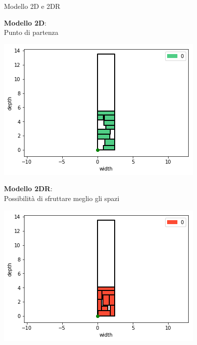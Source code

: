 \documentclass{beamer}
\begin{document}
\begin{frame}{Modello 2D e 2DR}
												
	\begin{minipage}[c]{0.45\textwidth}
		\textbf{Modello 2D}:\\Punto di partenza
	\end{minipage}
	\hfill
	\begin{minipage}[c]{0.45\textwidth}
		\includegraphics[width=1\linewidth]{figures/general2D}
	\end{minipage}
										
	\begin{minipage}[c]{0.45\textwidth}
		\textbf{Modello 2DR}:\\Possibilit\`a di sfruttare meglio gli spazi
	\end{minipage}
	\hfill
	\begin{minipage}[c]{0.45\textwidth}
		\includegraphics[width=1\linewidth]{figures/general2DR}
	\end{minipage}
\end{frame}
\end{document}
